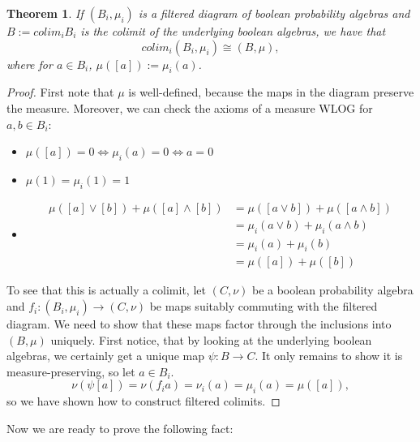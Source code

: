 \documentclass[a4paper]{amsproc}
\theoremstyle{plain}
\newtheorem{theorem}{Theorem}[section]
\theoremstyle{definition}
\theoremstyle{remark}
\numberwithin{equation}{section}
\begin{document}
\begin{theorem} 
If $(B_i, \mu_i)$ is a filtered diagram of boolean probability algebras and $B := colim_i B_i$ is the colimit of the underlying boolean algebras, we have that
\[
colim_i (B_i, \mu_i) \cong (B, \mu),
\]
where for $a \in B_i$, $\mu([a]) := \mu_i(a)$.
\end{theorem}
\begin{proof}
First note that $\mu$ is well-defined, because the maps in the diagram preserve the measure. Moreover, we can check the axioms of a measure WLOG for $a,b \in B_i$:
\begin{itemize}
\item $\mu([a]) = 0 \Leftrightarrow \mu_i(a) = 0 \Leftrightarrow a = 0$
\item $\mu(1) = \mu_i(1) = 1$
\item \begin{align*}
\mu([a] \vee [b]) + \mu([a] \wedge [b]) &= \mu([a \vee b]) + \mu([a \wedge b]) \\
&= \mu_i(a \vee b) + \mu_i(a \wedge b) \\
&= \mu_i(a) + \mu_i(b) \\
&= \mu([a]) + \mu([b])
\end{align*}
\end{itemize}
To see that this is actually a colimit, let $(C, \nu)$ be a boolean probability algebra and $f_i : (B_i, \mu_i) \to (C, \nu)$ be maps suitably commuting with the filtered diagram. We need to show that these maps factor through the inclusions into $(B, \mu)$ uniquely. First notice, that by looking at the underlying boolean algebras, we certainly get a unique map $\psi: B \to C$.  It only remains to show it is measure-preserving, so let $a \in B_i$.
\[
\nu(\psi [a]) = \nu(f_i a) = \nu_i(a) = \mu_i(a) = \mu([a]),
\]
so we have shown how to construct filtered colimits.
\end{proof}

Now we are ready to prove the following fact:
\end{document}
